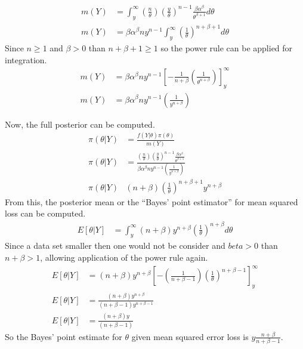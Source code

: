 \documentclass[11pt]{article}
\begin{document}
\begin{align*}
m(Y)&=\int_{y}^{\infty} \left( \frac{n}{\theta} \right)\left(\frac{y}{\theta} \right)^{n-1} \frac{\beta \alpha^\beta}{\theta^{\beta+1}} d \theta \\
m(Y)&= \beta \alpha^\beta n y^{n-1} \int_{y}^{\infty} \left( \frac{1}{\theta} \right)^{n+\beta+1} d \theta
\end{align*}
Since $n\geq 1$ and $\beta>0$ than $n+\beta+1 \geq 1$ so the power rule can be applied for integration.
\begin{align*}
m(Y)&= \beta \alpha^\beta n y^{n-1} \left[-\frac{1}{n+\beta} \left(\frac{1}{\theta^{n+\beta}} \right) \right]_y^{\infty} \\
m(Y)&= \beta \alpha^\beta n y^{n-1} \left( \frac{1}{y^{n+\beta}} \right) 
\end{align*}

Now, the full posterior can be computed.
\begin{align*}
\pi(\theta|Y) &=\frac{ f(Y| \theta) \pi (\theta)}{m(Y)} \\
\pi(\theta|Y) &=\frac{\left( \frac{n}{\theta} \right)\left(\frac{y}{\theta} \right)^{n-1} \frac{\beta \alpha^\beta}{\theta^{\beta+1}}}{\beta \alpha^\beta n y^{n-1} \left( \frac{1}{y^{n+\beta}} \right) } \\
\pi(\theta|Y) & (n + \beta) \left( \frac{1}{\theta} \right)^{n+\beta+1} y^{n+\beta} 
\end{align*}
From this, the posterior mean or the ``Bayes' point estimator'' for mean squared loss can be computed.
\begin{align*}
E[\theta|Y] &= \int_{y}^\infty (n+\beta) y^{n+\beta}\left(  \frac{1}{\theta} \right)^{n+\beta} d\theta 
\end{align*}
Since a data set smaller then one would not be consider and $beta>0$ than $n+\beta>1$, allowing application of the power rule again. \begin{align*}
E[\theta|Y] &=  (n+\beta) y^{n+\beta} \left[ - \left( \frac{1}{n+\beta-1} \right) \left(  \frac{1}{\theta} \right)^{n+\beta-1} \right]_y^\infty \\
E[\theta|Y] &= \frac{(n+\beta) y^{n+\beta}}{(n+\beta-1)y^{n+\beta-1}} \\
E[\theta|Y] &= \frac{(n+\beta) y}{(n+\beta-1)} 
\end{align*}
So the Bayes' point estimate for $\theta$ given mean squared error loss is $y\frac{n+\beta}{n+\beta-1}$. 

\newpage
\end{document}
